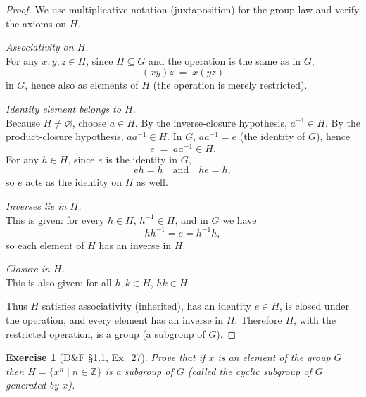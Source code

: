 \documentclass[12pt]{article}
\newtheorem{exercise}[theorem]{Exercise}
\theoremstyle{definition}
\begin{document}
\begin{proof}
We use multiplicative notation (juxtaposition) for the group law and verify the axioms on $H$.

\dotfill

\noindent\emph{Associativity on $H$.}\\

\noindent
For any $x,y,z\in H$, since $H\subseteq G$ and the operation is the same as in $G$,
\[
(xy)z \;=\; x(yz)
\]
in $G$, hence also as elements of $H$ (the operation is merely restricted).

\dotfill

\noindent\emph{Identity element belongs to $H$.}\\

\noindent
Because $H\neq\varnothing$, choose $a\in H$. By the inverse-closure hypothesis, $a^{-1}\in H$.
By the product-closure hypothesis, $aa^{-1}\in H$. In $G$, $aa^{-1}=e$ (the identity of $G$), hence
\[
e \;=\; aa^{-1} \in H.
\]
For any $h\in H$, since $e$ is the identity in $G$,
\[
eh=h \quad\text{and}\quad he=h,
\]
so $e$ acts as the identity on $H$ as well.

\dotfill

\noindent\emph{Inverses lie in $H$.}\\

\noindent
This is given: for every $h\in H$, $h^{-1}\in H$, and in $G$ we have
\[
hh^{-1}=e=h^{-1}h,
\]
so each element of $H$ has an inverse in $H$.

\dotfill

\noindent\emph{Closure in $H$.}\\

\noindent
This is also given: for all $h,k\in H$, $hk\in H$.

\dotfill

\noindent
Thus $H$ satisfies associativity (inherited), has an identity $e\in H$, is closed under the operation,
and every element has an inverse in $H$. Therefore $H$, with the restricted operation, is a group (a subgroup of $G$).
\end{proof}

\newpage

\begin{exercise}[D\&F §1.1, Ex.~27]
Prove that if $x$ is an element of the group $G$ then $H=\{x^n \mid n\in\mathbb{Z}\}$ is a subgroup of $G$
(called the cyclic subgroup of $G$ generated by $x$).
\end{exercise}
\end{document}

